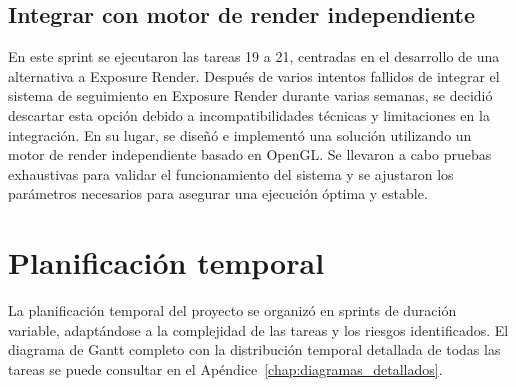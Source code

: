 \subsection{Integrar con motor de render independiente}
En este sprint se ejecutaron las tareas 19 a 21, centradas en el desarrollo de una alternativa a Exposure Render. Después de varios intentos fallidos de integrar el sistema de seguimiento en Exposure Render durante varias semanas, se decidió descartar esta opción debido a incompatibilidades técnicas y limitaciones en la integración. En su lugar, se diseñó e implementó una solución utilizando un motor de render independiente basado en OpenGL. Se llevaron a cabo pruebas exhaustivas para validar el funcionamiento del sistema y se ajustaron los parámetros necesarios para asegurar una ejecución óptima y estable.

\section{Planificación temporal}
La planificación temporal del proyecto se organizó en sprints de duración variable, adaptándose a la complejidad de las tareas y los riesgos identificados. El diagrama de Gantt completo con la distribución temporal detallada de todas las tareas se puede consultar en el Apéndice~\ref{chap:diagramas_detallados}.
